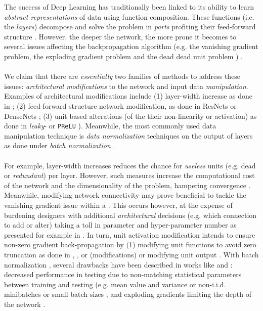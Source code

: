 The success of Deep Learning has traditionally been linked to its ability to learn \emph{abstract representations} of data using function composition\cite{LeCun06atutorial}. These functions (i.e. the \emph{layers}) decompose and solve the problem in \emph{parts} \cite{resnetSubtree} profiting their feed-forward structure \cite{backprop}. However, the deeper the network, the more prone it becomes to several issues affecting the backpropagation algorithm (e.g. the vanishing gradient problem, \cite{vanishing1,vanishing2} the exploding gradient problem \cite{exploding} and the dead dead unit problem \cite{leaky,whyreludie,whenneuronsfail}) \cite{backprop}. 
\\\\
We claim that there are \emph{essentially} two families of methods to address these issues: \emph{architectural modifications} to the network and input data \emph{manipulation}. Examples of architectural modifications include (1) layer-width increase as done in \cite{wideresnet,inceptionv1}; (2) feed-forward structure network modification, as done in ResNets \cite{resnet} or DenseNets \cite{densenet}; (3) unit based alterations (of the their non-linearity or activation) as done in \emph{leaky}-\ReLU \cite{leaky} or \texttt{PReLU} \cite{prelu}). Meanwhile, the most commonly used data manipulation technique is \emph{data normalization} techniques on the output of layers as done under \emph{batch normalization} \cite{batchnorm}.  
\\\\
For example, layer-width increases reduces the chance for \emph{useless} units (e.g. dead or \emph{redundant}) per layer. However, such measures increase the computational cost of the network and the dimensionality of the problem, hampering convergence \cite{cursedim}. Meanwhile, modifying network connectivity may prove beneficial to tackle the vanishing gradient issue within a \cite{ladder,nin,highway}. This occurs however, at the expense of burdening designers with additional \emph{architectural} decisions (e.g. which connection to add or alter) taking a toll in parameter and hyper-parameter number as presented for example in \cite{densenet}. In turn, unit activation modification intends to ensure non-zero gradient back-propagation by (1) modifying unit functions to avoid zero truncation as done in \cite{leaky}, \cite{prelu}, \cite{elu} or \cite{selu} (\ReLU modifications) or modifying unit output \cite{crelu}. With batch normalization \cite{batchnorm}, several drawbacks have been described in works like \cite{batchrenorm} and \cite{batchnormGradientExplosion}: decreased performance in testing due to non-matching statistical parameters between training and testing (e.g. mean value and variance or non-i.i.d. minibatches or small batch sizes \cite{batchrenorm}; and exploding gradients limiting the depth of the network \cite{batchnormGradientExplosion}.
